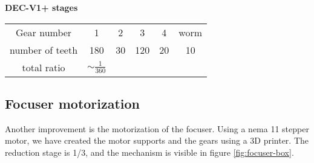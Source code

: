 \begin{minipage}
    {0.5\textwidth}
    \textbf{DEC-V1+ stages}\\
    \centering
    \begin{tabular}{cccccc}
        \hline
        Gear number & 1 & 2 & 3 & 4 & worm\\
        number of teeth & 180 & 30 & 120 & 20 & 10\\
        \hline
        total ratio & \(\sim \frac{1}{360}\) &&&
    \end{tabular}
    \label{tab:DEC_gear_spec_v1p}
\end{minipage}

\subsection{Focuser motorization}
Another improvement is the motorization of the focuser.
Using a nema 11 stepper motor, we have created the motor supports and the gears using a 3D printer.
The reduction stage is 1/3, and the mechanism is visible in figure \ref{fig:focuser-box}.